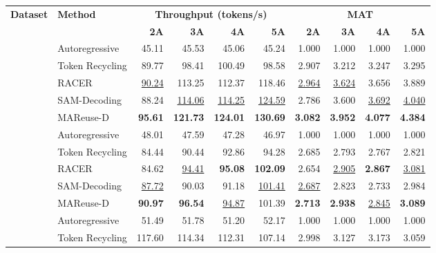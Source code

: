 \documentclass[letterpaper]{article} %
\newcommand{\thickhline}{\noalign{\hrule height 0.8pt}}
\begin{document}
\begin{table}[t]
\centering
\small
\setlength{\tabcolsep}{11pt}
\begin{tabular}{clrrrrrrrr}
\thickhline
\textbf{Dataset} & \textbf{Method} & \multicolumn{4}{c}{\textbf{Throughput (tokens/s)}} & \multicolumn{4}{c}{\textbf{MAT}} \\
\cline{3-6}\cline{7-10}
 & & \textbf{2A} & \textbf{3A} & \textbf{4A} & \textbf{5A} & \textbf{2A} & \textbf{3A} & \textbf{4A} & \textbf{5A} \\
\hline
\addlinespace[1pt]
\multirow{5}{*}{GSM8K} & Autoregressive & 45.11 & 45.53 & 45.06 & 45.24 & 1.000 & 1.000 & 1.000 & 1.000 \\
 \addlinespace[1pt]
 & Token Recycling & 89.77 & 98.41 & 100.49 & 98.58 & 2.907 & 3.212 & 3.247 & 3.295 \\
 \addlinespace[1pt]
 & RACER & \underline{90.24} & 113.25 & 112.37 & 118.46 & \underline{2.964} & \underline{3.624} & 3.656 & 3.889 \\
 \addlinespace[1pt]
 & SAM-Decoding & 88.24 & \underline{114.06} & \underline{114.25} & \underline{124.59} & 2.786 & 3.600 & \underline{3.692} & \underline{4.040} \\
 \addlinespace[1pt]
 & MAReuse-D & \textbf{95.61} & \textbf{121.73} & \textbf{124.01} & \textbf{130.69} & \textbf{3.082} & \textbf{3.952} & \textbf{4.077} & \textbf{4.384} \\
\hline
\addlinespace[1pt]
\multirow{5}{*}{MMLU} & Autoregressive & 48.01 & 47.59 & 47.28 & 46.97 & 1.000 & 1.000 & 1.000 & 1.000 \\
 \addlinespace[1pt]
 & Token Recycling & 84.44 & 90.44 & 92.86 & 94.28 & 2.685 & 2.793 & 2.767 & 2.821 \\
 \addlinespace[1pt]
 & RACER & 84.62 & \underline{94.41} & \textbf{95.08} & \textbf{102.09} & 2.654 & \underline{2.905} & \textbf{2.867} & \underline{3.081} \\
 \addlinespace[1pt]
 & SAM-Decoding & \underline{87.72} & 90.03 & 91.18 & \underline{101.41} & \underline{2.687} & 2.823 & 2.733 & 2.984 \\
 \addlinespace[1pt]
 & MAReuse-D & \textbf{90.97} & \textbf{96.54} & \underline{94.87} & 101.39 & \textbf{2.713} & \textbf{2.938} & \underline{2.845} & \textbf{3.089} \\
\hline
\addlinespace[1pt]
\multirow{5}{*}{HumanEval} & Autoregressive & 51.49 & 51.78 & 51.20 & 52.17 & 1.000 & 1.000 & 1.000 & 1.000 \\
 \addlinespace[1pt]
 & Token Recycling & 117.60 & 114.34 & 112.31 & 107.14 & 2.998 & 3.127 & 3.173 & 3.059 \\

\end{tabular}
\end{table}
\end{document}
